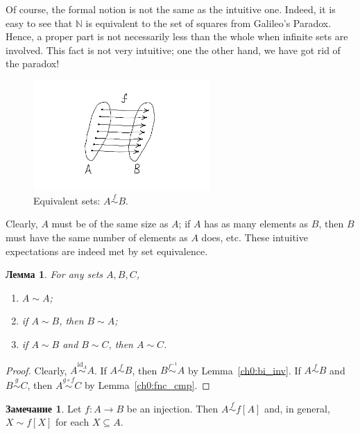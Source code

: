 \documentclass[12pt,notitlepage]{article}
\theoremstyle{plain}
\newtheorem{lemma}[thm]{Лемма}
\theoremstyle{definition}
\newtheorem{rem}[thm]{Замечание}
\theoremstyle{plain}
\newcommand{\N}{\mathbb{N}}
\newcommand{\sbs}{\subseteq}
\newcommand{\id}{\mathrm{id}}
\newcommand{\1}{\mathbf{1}}
\newcommand{\0}{\mathbf{0}}
\begin{document}
Of course, the formal notion is not the same as the intuitive one. Indeed, it is easy to see that $\N$ is equivalent to the set of squares from Galileo's Paradox. Hence, a proper part is not necessarily less than the whole when infinite sets are involved. This fact is not very intuitive; one the other hand, we have got rid of the paradox!

\begin{figure}[h]
	\centering
	\includegraphics*[width=0.6\textwidth]{eq_sets.pdf}
	\caption{Equivalent sets: $A \stackrel{f}{\sim} B$.}
\end{figure}

Clearly, $A$ must be of the same size as $A$; if $A$ has as many elements as $B$, then $B$ must have the same number of elements as $A$ does, etc. These intuitive expectations are indeed met by set equivalence.
\begin{lemma}\label{ch0:l157} For any sets $A, B, C$,
	\begin{enumerate}
		\item $A \sim A$;
		\item if $A \sim B$, then $B \sim A$;
		\item if $A \sim B$ and $B \sim C$, then $A \sim C$.
	\end{enumerate}
\end{lemma}
\begin{proof}
	Clearly, $A \stackrel{\id_A}{\sim} A$. If $A \stackrel{f}{\sim} B$, then $B \stackrel{f^{-1}}{\sim} A$ by Lemma~\ref{ch0:bi_inv}. If $A \stackrel{f}{\sim} B$ and $B \stackrel{g}{\sim} C$, then $A \stackrel{g \circ f}{\sim} C$ by Lemma~\ref{ch0:fnc_cmp}.
\end{proof}

\begin{rem}\label{ch0:inj_img}
	Let $f\colon A \to B$ be an injection. Then $A \stackrel{f}{\sim} f[A]$ and, in general, $X \sim f[X]$ for each $X \sbs A$.
\end{rem}
\end{document}
